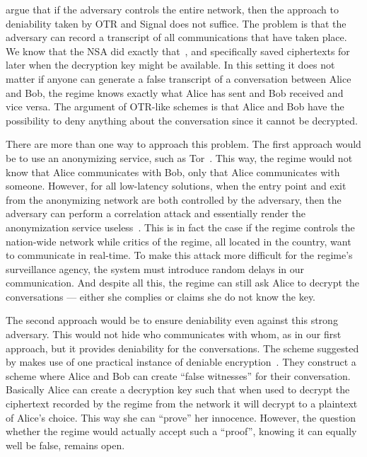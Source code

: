 \citet{OTPKX} argue that if the adversary controls the entire network, then the
approach to deniability taken by \ac{OTR} and Signal does not suffice.
The problem is that the adversary can record a transcript of all communications
that have taken place.
We know that the \ac{NSA} did exactly that~\cite{XKeyscore}, and specifically 
saved ciphertexts for later when the decryption key might be available.
In this setting it does not matter if anyone can generate a false transcript of
a conversation between Alice and Bob, the regime knows exactly what Alice has 
sent and Bob received and vice versa.
The argument of \ac{OTR}-like schemes is that Alice and Bob have the possibility 
to deny anything about the conversation since it cannot be decrypted.

There are more than one way to approach this problem.
The first approach would be to use an anonymizing service, such as 
Tor~\cite{Tor}.
This way, the regime would not know that Alice communicates with Bob, only that
Alice communicates with someone.
However, for all low-latency solutions, when the entry point and exit from the 
anonymizing network are both controlled by the adversary, then the adversary 
can perform a correlation attack and essentially render the anonymization 
service useless~\cite{SystemsForAnonymousCommunication}.
This is in fact the case if the regime controls the nation-wide network while 
critics of the regime, all located in the country, want to communicate in 
real-time.
To make this attack more difficult for the regime's surveillance
agency, the system must 
introduce random delays in our communication. %
And despite all this, the regime can still ask Alice to decrypt the 
conversations --- either she complies or claims she do not know the key.

The second approach would be to ensure deniability even against this strong 
adversary.
This would not hide who communicates with whom, as in our first approach, but 
it provides deniability for the conversations.
The scheme suggested by \citet{OTPKX} makes use of one practical instance of 
deniable encryption~\cite{DeniableEncryption}.
They construct a scheme where Alice and Bob can create \enquote{false 
witnesses} for their conversation.
Basically Alice can create a decryption key such that when used to decrypt the 
ciphertext recorded by the regime from the network it will decrypt to 
a plaintext of Alice's choice.
This way she can \enquote{prove} her innocence.
However, the question whether the regime would actually accept such 
a \enquote{proof}, knowing it can equally well be false, remains open.
